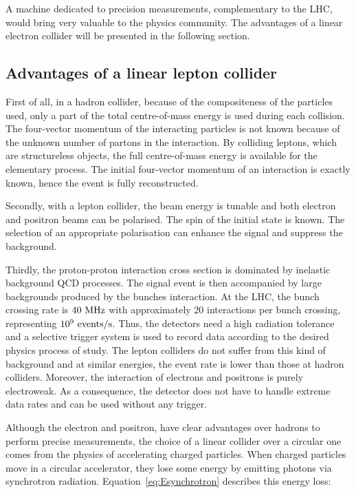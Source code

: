   A machine dedicated to precision measurements, complementary to the \gls{LHC}, would bring very valuable to the physics community.
  The advantages of a linear electron collider will be presented in the following section.

    \subsection{Advantages of a linear lepton collider}
    \label{subsec:advLLC}
    
    First of all, in a hadron collider, because of the compositeness of the particles used, only a part of the total centre-of-mass energy is used during each collision.
    The four-vector momentum  of the interacting particles is not known because of the unknown number of partons in the interaction.
    By colliding leptons, which are structureless objects, the full centre-of-mass energy is available for the elementary process. 
    The initial four-vector momentum of an interaction is exactly known, hence the event is fully reconstructed.

    Secondly, with a lepton collider, the beam energy is tunable and both electron and positron beams can be polarised. 
    The spin of the initial state is known.
    The selection of an appropriate polarisation can enhance the signal and suppress the background. 

    Thirdly, the proton-proton interaction cross section is dominated by inelastic background QCD processes.
    The signal event is then accompanied by large backgrounds produced by the bunches interaction.
    At the \gls{LHC}, the bunch crossing rate is $40~\rm{MHz}$ with approximately $20$ interactions per bunch crossing, representing $10^9~\rm{events/s}$.
    Thus, the detectors need a high radiation tolerance and a selective trigger system is used to record data according to the desired physics process of study.
    The lepton colliders do not suffer from this kind of background and at similar energies, the event rate is lower than those at hadron colliders.
    Moreover, the interaction of electrons and positrons is purely electroweak.
    As a consequence, the detector does not have to handle extreme data rates and can be used without any trigger.

    Although the electron and positron, have clear advantages over hadrons to perform precise measurements, the choice of a linear collider over a circular one comes from the physics of accelerating charged particles.
    When charged particles move in a circular accelerator, they lose some energy by emitting photons via synchrotron radiation.
    Equation~\ref{eq:Esynchrotron} describes this energy loss:
    
